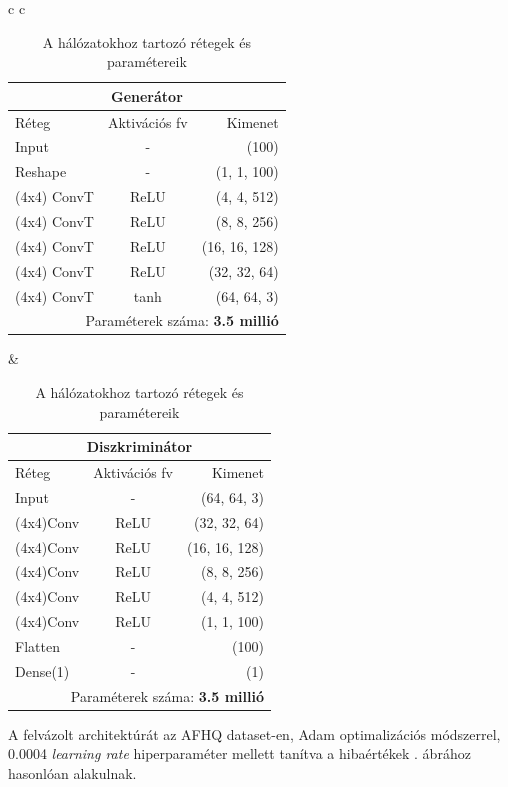 \begin{table}[h!]
	\centering
\caption{A hálózatokhoz tartozó rétegek és paramétereik}
\label{tab:gen_disc_params}
\medskip
\begin{tabular}{c c}
\scriptsize{
\begin{tabular}{@{\extracolsep{5pt}} |l c r| }
	\hline
	\multicolumn{3}{|c|}{\textbf{Generátor}} \\
	\hline
	Réteg & Aktivációs fv & Kimenet\\
	\cline{1-1} \cline{2-2} \cline{3-3}
	Input & - & (100)\\
	Reshape & - & (1, 1, 100)\\
	(4x4) ConvT & ReLU & (4, 4, 512)\\
	(4x4) ConvT & ReLU & (8, 8, 256)\\
	(4x4) ConvT & ReLU & (16, 16, 128)\\
	(4x4) ConvT & ReLU & (32, 32, 64)\\
	(4x4) ConvT & tanh & (64, 64, 3)\\
	\hline
	\multicolumn{3}{|r|}{Paraméterek száma: \textbf{3.5 millió}} \\
	\hline
\end{tabular}}

&\scriptsize{
\begin{tabular}{@{\extracolsep{5pt}} |l c r| }
	\hline
	\multicolumn{3}{|c|}{\textbf{Diszkriminátor}} \\
	\hline
	Réteg & Aktivációs fv & Kimenet\\
	\cline{1-1} \cline{2-2} \cline{3-3}
	Input & - & (64, 64, 3)\\
	(4x4)Conv & ReLU & (32, 32, 64)\\
	(4x4)Conv & ReLU & (16, 16, 128)\\
	(4x4)Conv & ReLU & (8, 8, 256)\\
	(4x4)Conv & ReLU & (4, 4, 512)\\
	(4x4)Conv & ReLU & (1, 1, 100)\\
	Flatten & - & (100)\\
	Dense(1) & - & (1)\\
	\hline
	\multicolumn{3}{|r|}{Paraméterek száma: \textbf{3.5 millió}} \\
	\hline
\end{tabular}}

\end{tabular}
\end{table}


A felvázolt architektúrát az AFHQ dataset-en, Adam optimalizációs módszerrel, 0.0004 \textit{learning rate} hiperparaméter mellett tanítva a hibaértékek . ábrához hasonlóan alakulnak.

